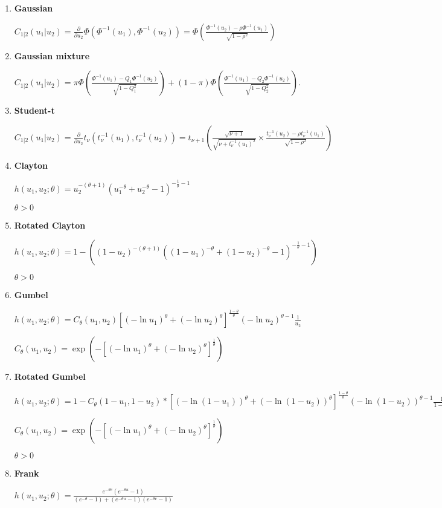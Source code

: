 \begin{enumerate}

\item \textbf{Gaussian}

$C_{1|2}(u_1 | u_2) = \frac{\partial}{\partial u_2} \Phi(\Phi^{-1}(u_1), \Phi^{-1}(u_2)) = \Phi \left( \frac{\Phi^{-1}(u_2) - \rho \Phi^{-1}(u_1)}{\sqrt{1 - \rho^2}} \right)$

\item \textbf{Gaussian mixture}

$
C_{1|2}(u_1 | u_2) = \pi \Phi\left(\frac{\Phi^{-1}(u_1) - Q_1 \Phi^{-1}(u_2)}{\sqrt{1 - Q_1^2}}\right) + (1 - \pi) \Phi\left(\frac{\Phi^{-1}(u_1) - Q_2 \Phi^{-1}(u_2)}{\sqrt{1 - Q_2^2}}\right).
$


\item \textbf{Student-t}

$C_{1|2}(u_1 | u_2) = \frac{\partial}{\partial u_2} t_\nu(t_\nu^{-1}(u_1), t_\nu^{-1}(u_2)) =t_{\nu + 1} \left( \frac{\sqrt{\nu + 1}}{\sqrt{\nu + t_\nu^{-1}(u_1)^2}} \times \frac{t_\nu^{-1}(u_2) - \rho t_\nu^{-1}(u_1)}{\sqrt{1 - \rho^2}} \right)$

\item \textbf{Clayton}

$
h(u_1, u_2; \theta) = u_2^{-(\theta + 1)} \left( u_1^{-\theta} + u_2^{-\theta} - 1 \right)^{-\frac{1}{\theta} - 1}
$

$\theta > 0$

\item \textbf{Rotated Clayton}

$
h(u_1, u_2; \theta) = 1 - \left( (1 - u_2)^{-(\theta + 1)} \left( (1 - u_1)^{-\theta} + (1 - u_2)^{-\theta} - 1 \right)^{-\frac{1}{\theta} - 1} \right)
$

$\theta > 0$

\item \textbf{Gumbel}

$
h(u_1, u_2; \theta) = C_\theta(u_1, u_2) \left[ (-\ln u_1)^{\theta} + (-\ln u_2)^{\theta} \right]^{\frac{1 - \theta}{\theta}}  (-\ln u_2)^{\theta-1} \frac{1}{u_2}
$

$
C_\theta(u_1, u_2) = \exp \left( -\left[ (-\ln u_1)^{\theta} + (-\ln u_2)^{\theta} \right]^{\frac{1}{\theta}} \right)
$

\item \textbf{Rotated Gumbel}

$
h(u_1, u_2; \theta) = 1 - C_\theta(1 - u_1, 1 - u_2) * \left[ (-\ln(1 - u_1))^{\theta} + (-\ln(1 - u_2))^{\theta} \right]^{\frac{1 - \theta}{\theta}}
(-\ln(1-u_2))^{\theta-1}
\frac{1}{1 - u_2}
$

$
C_\theta(u_1, u_2) = \exp \left( -\left[ (-\ln u_1)^{\theta} + (-\ln u_2)^{\theta} \right]^{\frac{1}{\theta}} \right)
$

$\theta > 0$


\item \textbf{Frank}

$
h(u_1, u_2; \theta) =
\frac{e^{-\theta v} \left( e^{-\theta u} - 1 \right)}{(e^{-\theta} - 1) + \left( e^{-\theta u} - 1 \right) \left( e^{-\theta v} - 1 \right)}
$

\end{enumerate}

